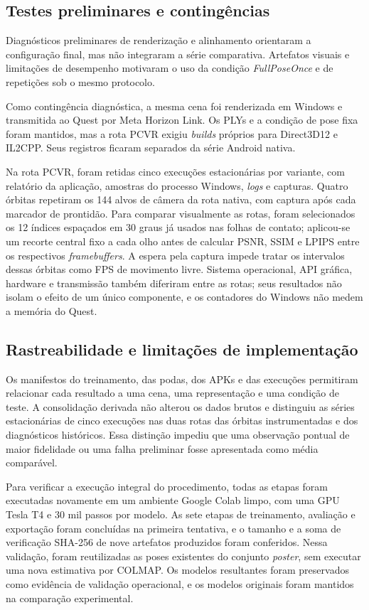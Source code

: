 \subsection{Testes preliminares e contingências}

Diagnósticos preliminares de renderização e alinhamento orientaram a configuração final, mas não integraram a série comparativa. Artefatos visuais e limitações de desempenho motivaram o uso da condição \textit{FullPoseOnce} e de repetições sob o mesmo protocolo.

Como contingência diagnóstica, a mesma cena foi renderizada em Windows e transmitida ao Quest por Meta Horizon Link. Os PLYs e a condição de pose fixa foram mantidos, mas a rota PCVR exigiu \textit{builds} próprios para Direct3D12 e IL2CPP. Seus registros ficaram separados da série Android nativa.

Na rota PCVR, foram retidas cinco execuções estacionárias por variante, com relatório da aplicação, amostras do processo Windows, \textit{logs} e capturas. Quatro órbitas repetiram os 144 alvos de câmera da rota nativa, com captura após cada marcador de prontidão. Para comparar visualmente as rotas, foram selecionados os 12 índices espaçados em 30 graus já usados nas folhas de contato; aplicou-se um recorte central fixo a cada olho antes de calcular PSNR, SSIM e LPIPS entre os respectivos \textit{framebuffers}. A espera pela captura impede tratar os intervalos dessas órbitas como FPS de movimento livre. Sistema operacional, API gráfica, hardware e transmissão também diferiram entre as rotas; seus resultados não isolam o efeito de um único componente, e os contadores do Windows não medem a memória do Quest.

\subsection{Rastreabilidade e limitações de implementação}

Os manifestos do treinamento, das podas, dos APKs e das execuções permitiram relacionar cada resultado a uma cena, uma representação e uma condição de teste. A consolidação derivada não alterou os dados brutos e distinguiu as séries estacionárias de cinco execuções nas duas rotas das órbitas instrumentadas e dos diagnósticos históricos. Essa distinção impediu que uma observação pontual de maior fidelidade ou uma falha preliminar fosse apresentada como média comparável.

Para verificar a execução integral do procedimento, todas as etapas foram executadas novamente em um ambiente Google Colab limpo, com uma GPU Tesla T4 e 30 mil passos por modelo. As sete etapas de treinamento, avaliação e exportação foram concluídas na primeira tentativa, e o tamanho e a soma de verificação SHA-256 de nove artefatos produzidos foram conferidos. Nessa validação, foram reutilizadas as poses existentes do conjunto \textit{poster}, sem executar uma nova estimativa por COLMAP. Os modelos resultantes foram preservados como evidência de validação operacional, e os modelos originais foram mantidos na comparação experimental.
